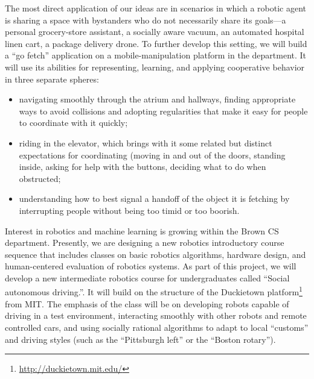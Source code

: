 The most direct application of our ideas are in scenarios in which a
robotic agent is sharing a space with bystanders who do not
necessarily share its goals---a personal grocery-store assistant, a
socially aware vacuum, an automated hospital linen cart, a package delivery
drone.  To further develop this setting,
we will
build a ``go fetch'' application on a mobile-manipulation platform in
the department.
It will use its abilities for representing, learning, and applying
cooperative behavior in three separate spheres:
\begin{itemize}
\item navigating smoothly through the atrium and hallways, finding
  appropriate ways to avoid collisions and adopting regularities that
  make it easy for people to coordinate with it quickly;
\item riding in the elevator, which brings with it some related but
  distinct expectations for coordinating (moving in and out of the
  doors, standing inside, asking for help with the buttons, deciding
  what to do when obstructed;
\item understanding how to best signal a handoff of the object it is
  fetching by interrupting people without being too timid or too
  boorish.
\end{itemize}

Interest in robotics and machine learning is growing within the Brown CS
department.  Presently, we are designing a new robotics introductory course sequence
that includes classes on basic robotics algorithms, hardware design,
and human-centered evaluation of robotics systems.  As part of this
project, we will develop a new intermediate robotics course for undergraduates called
``Social autonomous driving.''.  It will build on the
structure of the Duckietown
platform\footnote{\url{http://duckietown.mit.edu/}} from MIT.  The emphasis
of the class will be on developing robots capable of driving in a test
environment, interacting smoothly with other robots and remote
controlled cars, and using socially rational algorithms to adapt to
local ``customs'' and driving styles (such as the ``Pittsburgh left''
or the ``Boston rotary'').


